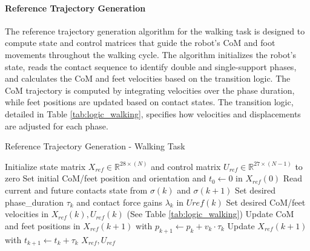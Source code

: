 \documentclass[main.tex]{subfiles}
\begin{document}
\begin{sloppypar}
\paragraph{Reference Trajectory Generation}
The reference trajectory generation algorithm for the walking task is designed to compute state and control matrices that guide the robot's CoM and foot movements throughout the walking cycle. The algorithm initializes the robot's state, reads the contact sequence to identify double and single-support phases, and calculates the CoM and feet velocities based on the transition logic.
The CoM trajectory is computed by integrating velocities over the phase duration, while feet positions are updated based on contact states. The transition logic, detailed in Table \ref{tab:logic_walking}, specifies how velocities and displacements are adjusted for each phase.
\begin{algorithm}[H]
\caption{Reference Trajectory Generation - Walking Task}
\label{alg:walking_task}
\begin{algorithmic}[1]
\State Initialize state matrix \( X_{ref} \in \mathbb{R}^{28 \times (N)} \) and control matrix \( U_{ref} \in \mathbb{R}^{27 \times (N-1)} \) to zero
\State Set initial CoM/feet position and orientation and $t_0 \gets 0$ in \(X_{ref}(0)\)
    \State Read current and future contacts state from \( \sigma(k) \) and \( \sigma(k+1) \)
    \State Set desired phase\_duration \( \tau_k \) and contact force gains \( \lambda_k \) in \(U{ref}(k)\)
    \State Set desired CoM/feet velocities in \( X_{ref}(k), U_{ref}(k) \)  (See Table \ref{tab:logic_walking})
    \State Update CoM and feet positions in \( X_{ref}(k+1) \) with \( p_{k+1} \gets p_k + v_k\cdot \tau_k \)
    \State Update \(  X_{ref}(k+1) \) with \( t_{k+1} \gets t_k + \tau_k \)
\EndFor
\State \Return \( X_{ref}, U_{ref} \)
\end{algorithmic}
\end{algorithm}
\begin{table}[H]
\centering
\renewcommand{\arraystretch}{1.2}
\caption{Transition logic for foot and CoM motion updates - Walking Task}
\label{tab:logic_walking}
\end{table}

\end{sloppypar}
\end{document}
